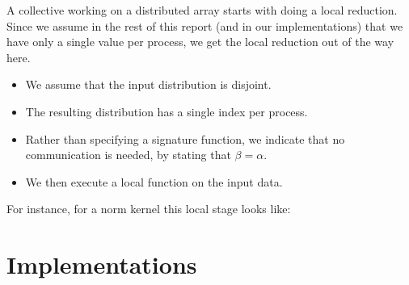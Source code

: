 \documentclass[11pt,fleqn,preprint]{impreport}
\begin{document}
A collective working on a distributed array starts with doing a local
reduction. Since we assume in the rest of this report (and in our
implementations) that we have only a single value per process, we get
the local reduction out of the way here.

\begin{itemize}
\item We assume that the input distribution is disjoint.
\item The resulting distribution has a single index per process.
\item Rather than specifying a signature function, we indicate that
  no communication is needed, by stating that $\beta=\alpha$.
\item We then execute a local function on the input data.
\end{itemize}
For instance, for a norm kernel this local stage looks like:

\section{Implementations}





\end{document}
